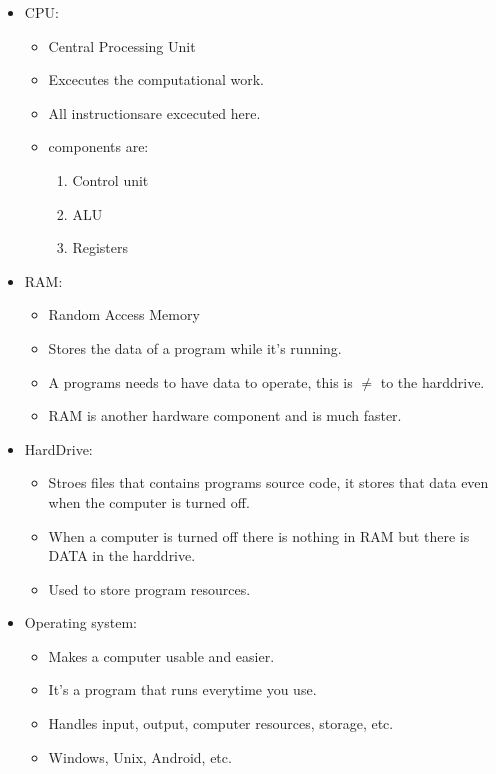 \begin{itemize}
    \item CPU:
        \begin{itemize}
            \item Central Processing Unit
            \item Excecutes the computational work.
            \item All instructionsare excecuted here.
            \item components are:
                \begin{enumerate}
                    \item Control unit 
                    \item ALU
                    \item Registers
                \end{enumerate}
        \end{itemize}

    \item RAM: 
        \begin{itemize}
            \item Random Access Memory 
            \item Stores the data of a program while it's running.
            \item A programs needs to have data to operate, this is $\neq$ to the harddrive.
            \item RAM is another hardware component and is much faster. 
        \end{itemize}
    
    \item HardDrive: 
        \begin{itemize}
            \item Stroes files that contains programs source code, it stores that data even when the computer is turned off.
            \item When a computer is turned off there is nothing in RAM but there is DATA in the harddrive.
            \item Used to store program resources.
        \end{itemize}
    
    \item Operating system:
        \begin{itemize}
            \item Makes a computer usable and easier.
            \item It's a program that runs everytime you use.
            \item Handles input, output, computer resources, storage, etc.
            \item Windows, Unix, Android, etc.
        \end{itemize}
    

\end{itemize}

